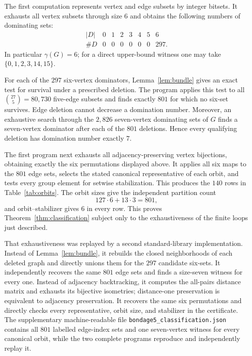 \documentclass[10pt]{article}
\begin{document}
The first computation represents vertex and edge subsets by integer bitsets.
It exhausts all vertex subsets through size $6$ and obtains the following
numbers of dominating sets:
\[
\begin{array}{c|rrrrrrr}
|D|&0&1&2&3&4&5&6\\ \hline
\#D&0&0&0&0&0&0&297.
\end{array}
\]
In particular $\gamma(G)=6$; for a direct upper-bound witness one may take
$\{0,1,2,3,14,15\}$.

For each of the $297$ six-vertex dominators, Lemma~\ref{lem:bundle} gives an
exact test for survival under a prescribed deletion.  The program applies
this test to all $\binom{27}{5}=80{,}730$ five-edge subsets and finds exactly
$801$ for which no six-set survives.  Edge deletion cannot decrease a
domination number.  Moreover, an exhaustive search through the $2{,}826$
seven-vertex dominating sets of $G$ finds a seven-vertex dominator after each
of the $801$ deletions.  Hence every qualifying deletion has domination
number exactly $7$.

The first program next exhausts all adjacency-preserving vertex bijections,
obtaining exactly the six permutations displayed above.  It applies all six
maps to the $801$ edge sets, selects the stated canonical representative of
each orbit, and tests every group element for setwise stabilization.  This
produces the $140$ rows in Table~\ref{tab:orbits}.  The orbit sizes give the
independent partition count
\[
127\cdot6+13\cdot3=801,
\]
and orbit--stabilizer gives $6$ in every row.  This proves
Theorem~\ref{thm:classification} subject only to the exhaustiveness of the
finite loops just described.

That exhaustiveness was replayed by a second standard-library implementation.
Instead of Lemma~\ref{lem:bundle}, it rebuilds the closed neighborhoods of
each deleted graph and directly unions them for the $297$ candidate six-sets.
It independently recovers the same $801$ edge sets and finds a size-seven
witness for every one.  Instead of adjacency backtracking, it computes the
all-pairs distance matrix and exhausts its bijective isometries; distance-one
preservation is equivalent to adjacency preservation.  It recovers the same
six permutations and directly checks every representative, orbit size, and
stabilizer in the certificate.  The supplementary machine-readable file
\texttt{bondage5\_classification.json} contains all $801$ labelled edge-index
sets and one seven-vertex witness for every canonical orbit, while the two
complete programs reproduce and independently replay it.
\end{document}
